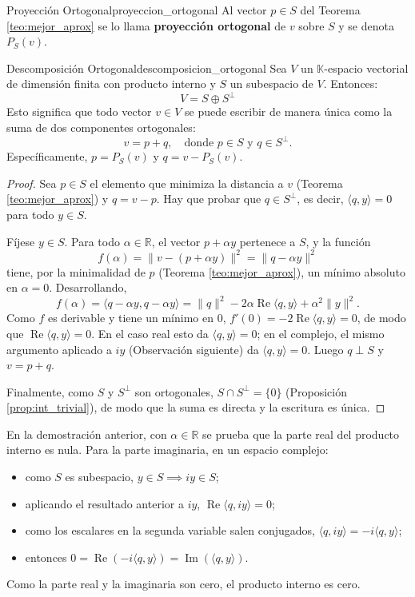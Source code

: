 \documentclass[11pt, a4paper]{article}
\begin{document}
\begin{definicion}{Proyección Ortogonal}{proyeccion_ortogonal}
Al vector $p \in S$ del Teorema \ref{teo:mejor_aprox} se lo llama \textbf{proyección ortogonal} de $v$ sobre $S$ y se denota $P_S(v)$.
\end{definicion}

\begin{teorema}{Descomposición Ortogonal}{descomposicion_ortogonal}
Sea $V$ un $\mathbb{K}$-espacio vectorial de dimensión finita con producto interno y $S$ un subespacio de $V$. Entonces:
\[
V = S \oplus S^\perp
\]
Esto significa que todo vector $v \in V$ se puede escribir de manera única como la suma de dos componentes ortogonales:
\[ v = p + q, \quad \text{donde } p \in S \text{ y } q \in S^\perp. \]
Específicamente, $p = P_S(v)$ y $q = v - P_S(v)$.
\end{teorema}

\begin{proof}
Sea $p \in S$ el elemento que minimiza la distancia a $v$ (Teorema \ref{teo:mejor_aprox}) y $q = v - p$. Hay que probar que $q \in S^\perp$, es decir, $\langle q, y \rangle = 0$ para todo $y \in S$.

Fíjese $y \in S$. Para todo $\alpha \in \mathbb{R}$, el vector $p + \alpha y$ pertenece a $S$, y la función
\[
f(\alpha) = \|v - (p + \alpha y)\|^2 = \|q - \alpha y\|^2
\]
tiene, por la minimalidad de $p$ (Teorema \ref{teo:mejor_aprox}), un mínimo absoluto en $\alpha = 0$. Desarrollando,
\[
f(\alpha) = \langle q - \alpha y, q - \alpha y \rangle = \|q\|^2 - 2\alpha \operatorname{Re}\langle q, y \rangle + \alpha^2 \|y\|^2.
\]
Como $f$ es derivable y tiene un mínimo en $0$, $f'(0) = -2 \operatorname{Re}\langle q, y \rangle = 0$, de modo que $\operatorname{Re}\langle q, y \rangle = 0$. En el caso real esto da $\langle q, y \rangle = 0$; en el complejo, el mismo argumento aplicado a $iy$ (Observación siguiente) da $\langle q, y \rangle = 0$. Luego $q \perp S$ y $v = p + q$.

Finalmente, como $S$ y $S^\perp$ son ortogonales, $S \cap S^\perp = \{0\}$ (Proposición \ref{prop:int_trivial}), de modo que la suma es directa y la escritura es única.
\end{proof}

\obs En la demostración anterior, con $\alpha \in \mathbb{R}$ se prueba que la parte real del producto interno es nula. Para la parte imaginaria, en un espacio complejo:
\begin{itemize}
    \item como $S$ es subespacio, $y \in S \implies iy \in S$;
    \item aplicando el resultado anterior a $iy$, $\operatorname{Re}\langle q, iy \rangle = 0$;
    \item como los escalares en la segunda variable salen conjugados, $\langle q, iy \rangle = -i \langle q, y \rangle$;
    \item entonces $0 = \operatorname{Re}(-i\langle q, y \rangle) = \operatorname{Im}(\langle q, y \rangle)$.
\end{itemize}
Como la parte real y la imaginaria son cero, el producto interno es cero.
\end{document}
